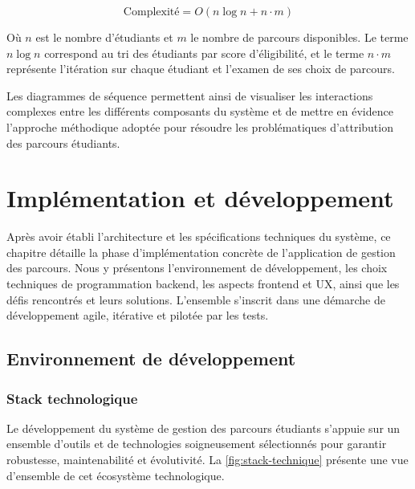 \documentclass[french,12pt]{report} %
\begin{document}
\begin{equation}
\text{Complexité} = O(n \log n + n \cdot m)
\end{equation}

Où $n$ est le nombre d'étudiants et $m$ le nombre de parcours disponibles. Le terme $n \log n$ correspond au tri des étudiants par score d'éligibilité, et le terme $n \cdot m$ représente l'itération sur chaque étudiant et l'examen de ses choix de parcours.

Les diagrammes de séquence permettent ainsi de visualiser les interactions complexes entre les différents composants du système et de mettre en évidence l'approche méthodique adoptée pour résoudre les problématiques d'attribution des parcours étudiants.

\chapter{Implémentation et développement}

\begin{definitionbox}
Après avoir établi l'architecture et les spécifications techniques du système, ce chapitre détaille la phase d'implémentation concrète de l'application de gestion des parcours. Nous y présentons l'environnement de développement, les choix techniques de programmation backend, les aspects frontend et UX, ainsi que les défis rencontrés et leurs solutions. L'ensemble s'inscrit dans une démarche de développement agile, itérative et pilotée par les tests.
\end{definitionbox}

\section{Environnement de développement}

\subsection{Stack technologique}

Le développement du système de gestion des parcours étudiants s'appuie sur un ensemble d'outils et de technologies soigneusement sélectionnés pour garantir robustesse, maintenabilité et évolutivité. La \autoref{fig:stack-technique} présente une vue d'ensemble de cet écosystème technologique.
\end{document}
